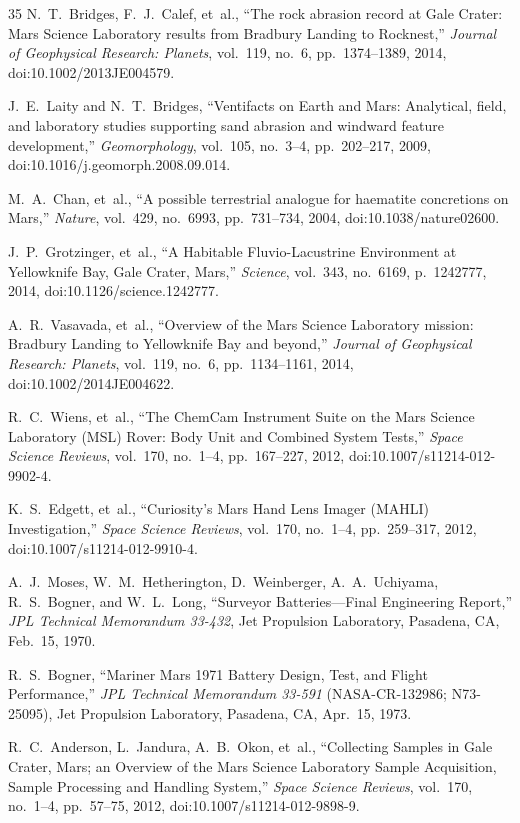 \documentclass[11pt,a4paper]{article}
\begin{document}
\begin{thebibliography}{35}
	N.~T.~Bridges, F.~J.~Calef, et~al., ``The rock abrasion record at Gale Crater: Mars Science Laboratory results from Bradbury Landing to Rocknest,'' \textit{Journal of Geophysical Research: Planets}, vol.~119, no.~6, pp.~1374--1389, 2014, doi:10.1002/2013JE004579.

	J.~E.~Laity and N.~T.~Bridges, ``Ventifacts on Earth and Mars: Analytical, field, and laboratory studies supporting sand abrasion and windward feature development,'' \textit{Geomorphology}, vol.~105, no.~3--4, pp.~202--217, 2009, doi:10.1016/j.geomorph.2008.09.014.

	M.~A.~Chan, et~al., ``A possible terrestrial analogue for haematite concretions on Mars,'' \textit{Nature}, vol.~429, no.~6993, pp.~731--734, 2004, doi:10.1038/nature02600.

	J.~P.~Grotzinger, et~al., ``A Habitable Fluvio-Lacustrine Environment at Yellowknife Bay, Gale Crater, Mars,'' \textit{Science}, vol.~343, no.~6169, p.~1242777, 2014, doi:10.1126/science.1242777.

	A.~R.~Vasavada, et~al., ``Overview of the Mars Science Laboratory mission: Bradbury Landing to Yellowknife Bay and beyond,'' \textit{Journal of Geophysical Research: Planets}, vol.~119, no.~6, pp.~1134--1161, 2014, doi:10.1002/2014JE004622.

	R.~C.~Wiens, et~al., ``The ChemCam Instrument Suite on the Mars Science Laboratory (MSL) Rover: Body Unit and Combined System Tests,'' \textit{Space Science Reviews}, vol.~170, no.~1--4, pp.~167--227, 2012, doi:10.1007/s11214-012-9902-4.

	K.~S.~Edgett, et~al., ``Curiosity's Mars Hand Lens Imager (MAHLI) Investigation,'' \textit{Space Science Reviews}, vol.~170, no.~1--4, pp.~259--317, 2012, doi:10.1007/s11214-012-9910-4.

	A.~J.~Moses, W.~M.~Hetherington, D.~Weinberger, A.~A.~Uchiyama, R.~S.~Bogner, and W.~L.~Long, ``Surveyor Batteries---Final Engineering Report,'' \textit{JPL Technical Memorandum 33-432}, Jet Propulsion Laboratory, Pasadena, CA, Feb.~15, 1970.

	R.~S.~Bogner, ``Mariner Mars 1971 Battery Design, Test, and Flight Performance,'' \textit{JPL Technical Memorandum 33-591} (NASA-CR-132986; N73-25095), Jet Propulsion Laboratory, Pasadena, CA, Apr.~15, 1973.

	R.~C.~Anderson, L.~Jandura, A.~B.~Okon, et~al., ``Collecting Samples in Gale Crater, Mars; an Overview of the Mars Science Laboratory Sample Acquisition, Sample Processing and Handling System,'' \textit{Space Science Reviews}, vol.~170, no.~1--4, pp.~57--75, 2012, doi:10.1007/s11214-012-9898-9.


\end{thebibliography}
\end{document}

